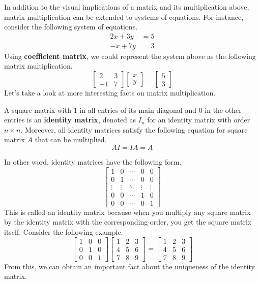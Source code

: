 \documentclass[../../main.tex]{subfiles}
\begin{document}
In addition to the visual implications of a matrix and its
multiplication above, matrix multiplication can be extended to
systems of equations. For instance, consider the following system
of equations.
\begin{align*}
    2x + 3y &= 5 \\
    -x + 7y &= 3
\end{align*}
Using \textbf{coefficient matrix}, we could represent the system
above as the following matrix multiplication.
\[
\begin{bmatrix}
    2  & 3 \\
    -1 & 7
\end{bmatrix}
\begin{bmatrix}
    x \\
    y
\end{bmatrix}
=
\begin{bmatrix}
    5 \\
    3
\end{bmatrix}
\]
Let's take a look at more interesting facts on matrix multiplication.

\begin{definition}{}{}
A square matrix with $1$ in all entries of its main diagonal and
$0$ in the other entries is an \textbf{identity matrix}, denoted as
$I_n$ for an identity matrix with order $n \times n$. Moreover,
all identity matrices satisfy the following equation for square
matrix $A$ that can be multiplied.
\[
AI = IA = A
\]
\end{definition}

In other word, identity matrices have the following form.
\[
\begin{bmatrix}
    1 & 0 & \cdots & 0 & 0 \\
    0 & 1 & \cdots & 0 & 0 \\
    \vdots & \vdots & \ddots & \vdots & \vdots \\
    0 & 0 & \cdots & 1 & 0 \\
    0 & 0 & \cdots & 0 & 1
\end{bmatrix}
\]
This is called an identity matrix because when you multiply any
square matrix by the identity matrix with the corresponding order,
you get the square matrix itself. Consider the following example.
\[
\begin{bmatrix}
    1 & 0 & 0 \\
    0 & 1 & 0 \\
    0 & 0 & 1
\end{bmatrix}
\begin{bmatrix}
    1 & 2 & 3 \\
    4 & 5 & 6 \\
    7 & 8 & 9
\end{bmatrix}
=
\begin{bmatrix}
    1 & 2 & 3 \\
    4 & 5 & 6 \\
    7 & 8 & 9
\end{bmatrix}
\]
From this, we can obtain an important fact about the uniqueness
of the identity matrix.
\end{document}
